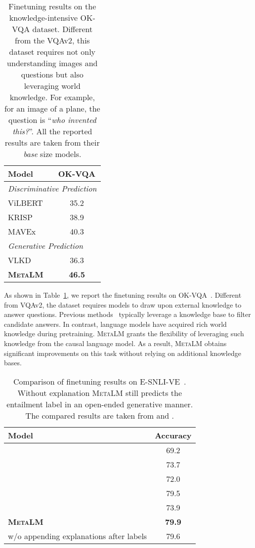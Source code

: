 \documentclass{article}
\theoremstyle{plain}
\theoremstyle{definition}
\theoremstyle{remark}
\newcommand\ours{\textsc{MetaLM}}
\begin{document}
\begin{table}[t]
\centering
\begin{tabular}{@{}lc}
\toprule
\textbf{Model} & \textbf{OK-VQA} \\
\midrule
\multicolumn{2}{l}{\textit{Discriminative Prediction}} \\
ViLBERT~\citep{lu2019vilbert} & 35.2 \\
KRISP~\citep{marino2021krisp} & 38.9 \\
MAVEx~\citep{wu2022MAVEx} & 40.3 \\ \midrule
\multicolumn{2}{l}{\textit{Generative Prediction}} \\
VLKD~\citep{dai2021enabling} & 36.3 \\
\textbf{\ours{}} & \textbf{46.5} \\
\bottomrule
\end{tabular}
\caption{Finetuning results on the knowledge-intensive OK-VQA dataset. Different from the VQAv2,
this dataset requires not only understanding images and questions but also leveraging world knowledge. For example, for an image of a plane, the question is ``\textit{who invented this?}''.
All the reported results are taken from their \textit{base} size models.}
\label{tab:vl:ft:okvqa}
\end{table}

As shown in Table~\ref{tab:vl:ft:okvqa}, we report the finetuning results on OK-VQA~\citep{marino2019okvqa}.
Different from VQAv2, the dataset requires models to draw upon external knowledge to answer questions.
Previous methods~\citep{marino2021krisp,wu2022MAVEx} typically leverage a knowledge base to filter candidate answers.
In contrast, language models have acquired rich world knowledge during pretraining. \ours{} grants the flexibility of leveraging such knowledge from the causal language model.
As a result, \ours{} obtains significant improvements on this task without relying on additional knowledge bases.


\begin{table}[t]
\centering
\begin{tabular}{@{}lc@{}}
\toprule
\textbf{Model} & \textbf{Accuracy} \\
\midrule
\citep{park2018multimodal} & 69.2 \\
\citep{wu-mooney-2019-faithful} & 73.7 \\
\citep{marasovic-etal-2020-natural} & 72.0 \\
\citep{kayser2021vil} & 79.5 \\
\citep{nlx-gpt} & 73.9 \\
\textbf{\ours{}} & \textbf{79.9} \\
\quad w/o appending explanations after labels & 79.6 \\
\bottomrule
\end{tabular}
\caption{Comparison of finetuning results on E-SNLI-VE~\citep{kayser2021vil}.
Without explanation \ours{} still predicts the entailment label in an open-ended generative manner.
The compared results are taken from \citep{kayser2021vil} and \citep{nlx-gpt}.
}
\label{tab:vl:ft:e-snli-ve:nlu}
\end{table}
\end{document}
